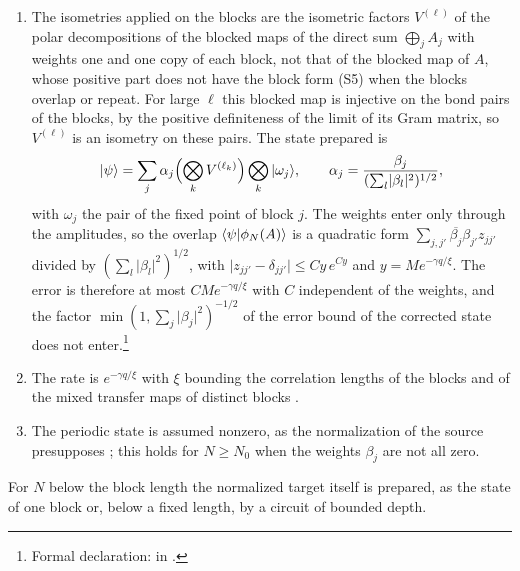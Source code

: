 \documentclass{article}
\begin{document}
\begin{enumerate}
    \item The isometries applied on the blocks are the isometric factors
          $V^{(\ell)}$ of the polar decompositions of the blocked maps of the
          direct sum $\bigoplus_jA_j$ with weights one and one copy of each
          block, not that of the blocked map of $A$, whose positive part does
          not have the block form (S5) when the blocks overlap or repeat. For
          large $\ell$ this blocked map is injective on the bond pairs of the
          blocks, by the positive definiteness of the limit of its Gram matrix,
          so $V^{(\ell)}$ is an isometry on these pairs. The state prepared is
          \begin{align*}
              |\psi\rangle=\sum_j\alpha_j\Bigl(\bigotimes_kV^{(\ell_k)}\Bigr)
              \bigotimes_k|\omega_j\rangle,\qquad
              \alpha_j=\frac{\beta_j}{(\sum_l\lvert\beta_l\rvert^2)^{1/2}},
          \end{align*}
          with $\omega_j$ the pair of the fixed point of block $j$. The weights
          enter only through the amplitudes, so the overlap
          $\langle \psi | \phi_N(A) \rangle$ is a quadratic form
          $\sum_{j,j'}\overline{\beta_j}\beta_{j'}z_{jj'}$ divided by
          $(\sum_l\lvert\beta_l\rvert^2)^{1/2}$, with
          $\lvert z_{jj'}-\delta_{jj'}\rvert\leq Cy\,e^{Cy}$ and
          $y=Me^{-\gamma q/\xi}$. The error is therefore at most
          $CMe^{-\gamma q/\xi}$ with $C$ independent of the weights, and the
          factor $\min(1,\sum_j\lvert\beta_j\rvert^2)^{-1/2}$ of the error bound
          of the corrected state \cite{gap:mswc24_repeated_overlap_small_weight_sum}
          does not enter.\footnote{Formal declaration:
              in .}
    \item The rate is $e^{-\gamma q/\xi}$ with $\xi$ bounding the correlation
          lengths of the blocks and of the mixed transfer maps of distinct
          blocks \cite{gap:mswc24_block_form_mixed_overlap}.
    \item The periodic state is assumed nonzero, as the normalization of the
          source presupposes \cite{gap:mswc24_depth_upper_bound_nonzero_state};
          this holds for $N\geq N_0$ when the weights $\beta_j$ are not all
          zero.
\end{enumerate}
For $N$ below the block length the normalized target itself is prepared, as
the state of one block or, below a fixed length, by a circuit of bounded depth.
\end{document}
